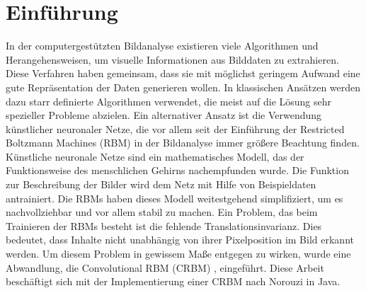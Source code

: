 \section{Einführung}\label{introduction}
In der computergestützten Bildanalyse existieren viele Algorithmen und Herangehensweisen, um visuelle Informationen aus Bilddaten zu extrahieren.
Diese Verfahren haben gemeinsam, dass sie mit möglichst geringem Aufwand eine gute Repräsentation der Daten generieren wollen.
In klassischen Ansätzen werden dazu starr definierte Algorithmen verwendet, die meist auf die Lösung sehr spezieller Probleme abzielen.
Ein alternativer Ansatz ist die Verwendung künstlicher neuronaler Netze, die vor allem seit der Einführung der Restricted Boltzmann Machines (RBM) \cite{Hinton06} in der Bildanalyse immer größere Beachtung finden.
Künstliche neuronale Netze sind ein mathematisches Modell, das der Funktionsweise des menschlichen Gehirns nachempfunden wurde.
Die Funktion zur Beschreibung der Bilder wird dem Netz mit Hilfe von Beispieldaten antrainiert.
Die RBMs haben dieses Modell weitestgehend simplifiziert, um es nachvollziehbar und vor allem stabil zu machen.
Ein Problem, das beim Trainieren der RBMs besteht ist die fehlende Translationsinvarianz.
Dies bedeutet, dass Inhalte nicht unabhängig von ihrer Pixelposition im Bild erkannt werden.
Um diesem Problem in gewissem Maße entgegen zu wirken, wurde eine Abwandlung, die Convolutional RBM (CRBM) \cite{Norouzi09}, \cite{Lee09} eingeführt.
Diese Arbeit beschäftigt sich mit der Implementierung einer CRBM nach Norouzi \cite{NorouziMaster} in Java.